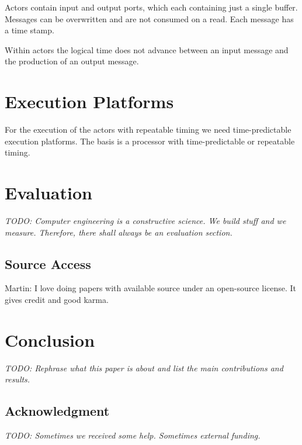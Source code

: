 \documentclass[a4paper, conference]{IEEEtran}
\newcommand{\todo}[1]{{\emph{TODO: #1}}}
\newcommand{\martin}[1]{{\color{blue} Martin: #1}}
\begin{document}
Actors contain input and output ports, which each containing just a single
buffer. Messages can be overwritten and are not consumed on a read.
Each message has a time stamp.

Within actors the logical time does not advance between an input message
and the production of an output message.

\section{Execution Platforms}

For the execution of the actors with repeatable timing we need time-predictable
execution platforms. The basis is a processor with time-predictable or repeatable
timing.

\section{Evaluation}
\label{sec:eval}

\todo{Computer engineering is a constructive science. We build stuff and we measure.
Therefore, there shall always be an evaluation section.}

\subsection{Source Access}

\martin{I love doing papers with available source under an
open-source license. It gives credit and good karma.}

\section{Conclusion}
\label{sec:conclusion}

\todo{Rephrase what this paper is about and list the main contributions and results.}

\subsection*{Acknowledgment}

\todo{Sometimes we received some help. Sometimes external funding.}

\end{document}
